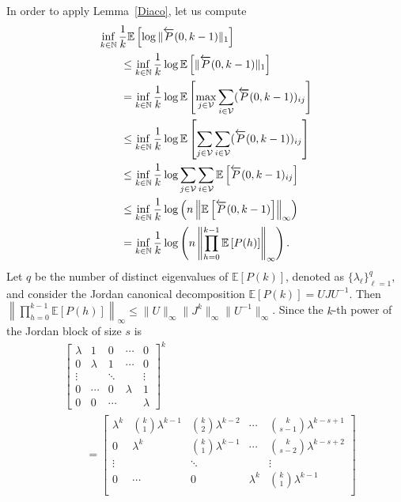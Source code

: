 \documentclass{IEEEtran}
\def\Exp{\mathbb{E}}
\newcommand{\1}{\mathbf{1}} \newcommand{\ind}{\mathds{1}}
\begin{document}
\begin{IEEEproof}
In order to apply Lemma~\ref{Diaco}, let us compute
\begin{align*}
&\inf_{k\in\N}\frac{1}{k}\Exp\left[\log\|\overleftarrow{P}(0,k-1)\|_{1 }\right]\\
&\qquad\leq \inf_{k\in\N}\frac{1}{k}\log\Exp\left[\|\overleftarrow{P}(0,k-1)\|_{1}\right]\\
& \qquad = \inf_{k\in\N}\frac{1}{k}\log\Exp\left[\max_{j\in \V}\sum_{i\in \V}(\overleftarrow{P}(0,k-1))_{ij}\right]\\
& \qquad\leq\inf_{k\in\N}\frac{1}{k}\log\Exp\left[\sum_{j\in \V}\sum_{i\in \V}(\overleftarrow{P}(0,k-1))_{ij}\right]\\
& \qquad\leq\inf_{k\in\N}\frac{1}{k}\log\sum_{j\in \V}\sum_{i\in \V}\Exp\left[\overleftarrow{P}(0,k-1)_{ij}\right]\\
& \qquad\leq\inf_{k\in\N}\frac{1}{k}\log\left(n\left\|\Exp\left[\overleftarrow{P}(0,k-1)\right]\right\|_{\infty}\right)\\
& \qquad =\inf_{k\in\N}\frac{1}{k}\log\left(n\left\|\prod_{h=0}^{k-1}\Exp\left[{P}(h)\right]\right\|_{\infty}\right).
\end{align*}
Let $q$ be the number of distinct eigenvalues of $\Exp[P(k)]$, denoted as 
$\{\lambda_{\ell}\}_{\ell=1}^{q}$, and consider the Jordan canonical decomposition $
\Exp\left[P(k)\right]=UJU^{-1}
$. Then $\left\|\prod_{h=0}^{k-1}\Exp\left[{P}(h)\right]\right\|_{\infty}\leq \|U\|_{\infty}\|J^k\|_{\infty}\|U^{-1}\|_{\infty}$. 
Since the $k$-th power of the Jordan block of size $s$ is 
\begin{align*}&\begin{bmatrix}\lambda & 1 & 0 & \cdots & 0\\
0 & \lambda & 1 & \cdots & 0\\
\vdots & & \ddots & & \vdots\\
0 & \cdots & 0 & \lambda & 1\\
0 & 0 & \cdots  & & \lambda
 \end{bmatrix}^k\\
&\qquad=
\begin{bmatrix}\lambda^k & {k \choose 1} \lambda^{k-1} & {k \choose 2} \lambda^{k-2} & \cdots  & {k \choose s-1} \lambda^{k-s+1}\\ 
0 & \lambda^k & {k \choose 1} \lambda^{k-1}& \cdots  & {k \choose s-2} \lambda^{k-s+2}\\
\vdots & & \ddots & & \vdots\\
0 & \cdots & 0 & \lambda^k & {k \choose 1} \lambda^{k-1}\\

\end{bmatrix}
\end{align*}
\end{IEEEproof}
\end{document}
